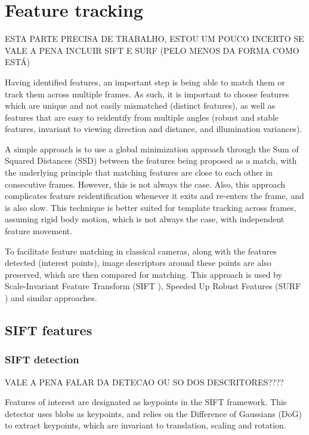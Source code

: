 \section{Feature tracking}
\label{sec:sec2_feature_tracking}

ESTA PARTE PRECISA DE TRABALHO, ESTOU UM POUCO INCERTO SE VALE A PENA INCLUIR SIFT E SURF (PELO MENOS DA FORMA COMO ESTÁ)

Having identified features, an important step is being able to match them or track them across multiple frames. As such, it is important to choose features which are unique and not easily mismatched (distinct features), as well as features that are easy to reidentify from multiple angles (robust and stable features, invariant to viewing direction and distance, and illumination variances).

A simple approach is to use a global minimization approach through the Sum of Squared Distances (SSD) between the features being proposed as a match, with the underlying principle that matching features are close to each other in consecutive frames. However, this is not always the case. Also, this approach complicates feature reidentification whenever it exits and re-enters the frame, and is also slow. This technique is better suited for template tracking across frames, assuming rigid body motion, which is not always the case, with independent feature movement.

To facilitate feature matching in classical cameras, along with the features detected (interest points), image descriptors around these points are also preserved, which are then compared for matching. This approach is used by Scale-Invariant Feature Transform (SIFT \cite{lowe1999object}), Speeded Up Robust Features (SURF \cite{bay2006surf}) and similar approaches.

\subsection{SIFT features}
\subsubsection{SIFT detection}
VALE A PENA FALAR DA DETECAO OU SO DOS DESCRITORES????

Features of interest are designated as keypoints in the SIFT framework. This detector uses blobs as keypoints, and relies on the Difference of Gaussians (DoG) to extract keypoints, which are invariant to translation, scaling and rotation.

